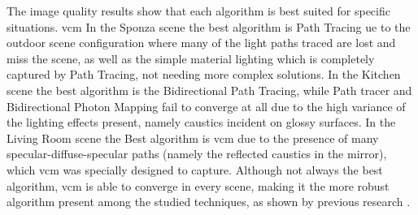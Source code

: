 The image quality results show that each algorithm is best suited for specific situations. \gls{vcm} In the Sponza scene the best algorithm is Path Tracing ue to the outdoor scene configuration where many of the light paths traced are lost and miss the scene, as well as the simple material lighting which is completely captured by Path Tracing, not needing more complex solutions. In the Kitchen scene the best algorithm is the Bidirectional Path Tracing, while Path tracer and Bidirectional Photon Mapping fail to converge at all due to the high variance of the lighting effects present, namely caustics incident on glossy surfaces. In the Living Room scene the Best algorithm is \gls{vcm} due to the presence of many specular-diffuse-specular paths (namely the reflected caustics in the mirror), which \gls{vcm} was specially designed to capture. Although not always the best algorithm, \gls{vcm} is able to converge in every scene, making it the more robust algorithm present among the studied techniques, as shown by previous research \citep{davidovivc2014progressive}.


